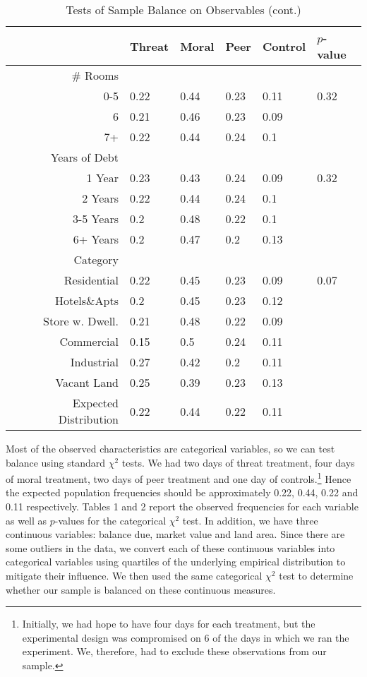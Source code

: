 \documentclass[12pt,titlepage]{article}
\begin{document}
\begin{table}[htbp]
\caption{Tests of Sample Balance on Observables (cont.)}  \label{table:balanceII}
\centering
\begin{tabular}{rlllll}
\hline
  & Threat & Moral & Peer & Control & $p$-value \\ 
  \hline
 \# Rooms &  &  &  &  &  \\ 
  0-5 & 0.22 & 0.44 & 0.23 & 0.11 & 0.32 \\ 
  6 & 0.21 & 0.46 & 0.23 & 0.09 &  \\ 
  7+ & 0.22 & 0.44 & 0.24 & 0.1 &  \\ 
   \hline
Years of Debt &  &  &  &  &  \\ 
  1 Year & 0.23 & 0.43 & 0.24 & 0.09 & 0.32 \\ 
  2 Years & 0.22 & 0.44 & 0.24 & 0.1 &  \\ 
  3-5 Years & 0.2 & 0.48 & 0.22 & 0.1 &  \\ 
  6+ Years & 0.2 & 0.47 & 0.2 & 0.13 &  \\ 
   \hline
Category &  &  &  &  &  \\ 
  Residential & 0.22 & 0.45 & 0.23 & 0.09 & 0.07 \\ 
  Hotels\&Apts & 0.2 & 0.45 & 0.23 & 0.12 &  \\ 
  Store w. Dwell. & 0.21 & 0.48 & 0.22 & 0.09 &  \\ 
  Commercial & 0.15 & 0.5 & 0.24 & 0.11 &  \\ 
  Industrial & 0.27 & 0.42 & 0.2 & 0.11 &  \\ 
  Vacant Land & 0.25 & 0.39 & 0.23 & 0.13 &  \\ 
   \hline
Expected Distribution & 0.22 & 0.44 & 0.22 & 0.11 &  \\ 
   \hline
\end{tabular}
\end{table}


Most of the observed characteristics are categorical variables, so we can
test balance using standard $\chi^2$ tests. We had two days of threat
treatment, four days of moral treatment, two days of peer treatment
and one day of controls.\footnote{Initially, we had hope to have four
  days for each treatment, but the experimental design was compromised
  on 6 of the days in which we ran the experiment. We, therefore, had
  to exclude these observations from our sample.} Hence the expected
population frequencies should be approximately 0.22, 0.44, 0.22 and
0.11 respectively. Tables 1 and 2 report the observed
frequencies for each variable as well as $p$-values for the
categorical $\chi^2$ test. In addition, we have three continuous
variables: balance due, market value and land area. Since there are
some outliers in the data, we convert each of these continuous
variables into categorical variables using quartiles of the underlying
empirical distribution to mitigate their influence. We then used the same
categorical $\chi^2$ test to determine whether our sample is balanced
on these continuous measures.
\end{document}
